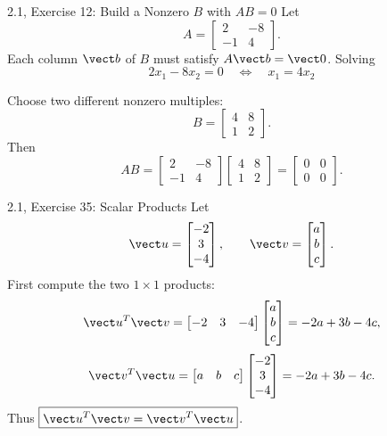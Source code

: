 \begin{frame}{2.1, Exercise 12: Build a Nonzero $B$ with $AB=0$}
Let
\[
A=\begin{bmatrix}2&-8\\-1&4\end{bmatrix}.
\]
Each column $\vect b$ of $B$ must satisfy $A\vect b=\vect0$.
Solving
\[
2x_1-8x_2=0
\quad\Longleftrightarrow\quad
x_1=4x_2
\]

Choose two different nonzero multiples:
\[
B=\begin{bmatrix}4&8\\1&2\end{bmatrix}.
\]
Then
\[
AB=
\begin{bmatrix}2&-8\\-1&4\end{bmatrix}
\begin{bmatrix}4&8\\1&2\end{bmatrix}
=\begin{bmatrix}0&0\\0&0\end{bmatrix}.
\]
\end{frame}

\begin{frame}{2.1, Exercise 35: Scalar Products}
Let
\[
\vect u=\begin{bmatrix}-2\\3\\-4\end{bmatrix},
\qquad
\vect v=\begin{bmatrix}a\\b\\c\end{bmatrix}.
\]
First compute the two $1\times1$ products:
\[
\vect u^T\vect v
=\begin{bmatrix}-2&3&-4\end{bmatrix}
\begin{bmatrix}a\\b\\c\end{bmatrix}
=-2a+3b-4c,
\]
\[
\vect v^T\vect u
=\begin{bmatrix}a&b&c\end{bmatrix}
\begin{bmatrix}-2\\3\\-4\end{bmatrix}
=-2a+3b-4c.
\]
Thus $\boxed{\vect u^T\vect v=\vect v^T\vect u}$.
\end{frame}

